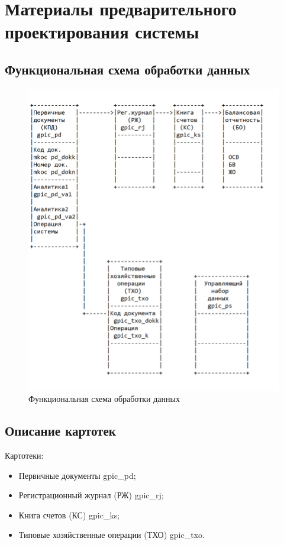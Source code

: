 \section{Материалы предварительного проектирования системы}
\subsection{Функциональная схема обработки данных}

\begin{figure}[!htb]
    \centering
    \includegraphics[width=15cm]
        {_assets/gpic_part2.png}
    \caption{Функциональная схема обработки данных}
    \label{fig:gpic_part2}
\end{figure}

\subsection{Описание картотек}

Картотеки:

\begin{itemize}
    \item Первичные документы gpic\_pd;
    \item Регистрационный журнал (РЖ) gpic\_rj;
    \item Книга счетов (КС) gpic\_ks;
    \item Типовые хозяйственные операции (ТХО) gpic\_txo.
\end{itemize}

